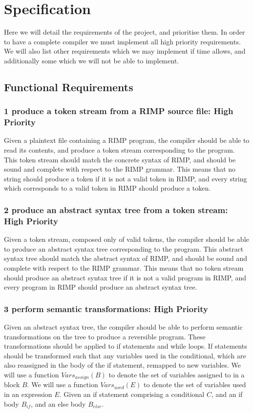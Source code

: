 \section*{Specification}

Here we will detail the requirements of the project, and prioritise them.
In order to have a complete compiler we must implement all high priority requirements.
We will also list other requirements which we may implement if time allows, and additionally some which we will not be able to implement.

\subsection*{Functional Requirements}
\subsubsection[1]{1 produce a token stream from a RIMP source file: High Priority}
Given a plaintext file containing a RIMP program, the compiler should be able to read its contents, and produce a token stream corresponding to the program.
This token stream should match the concrete syntax of RIMP, and should be sound and complete with respect to the RIMP grammar.
This means that no string should produce a token if it is not a valid token in RIMP, and every string which corresponds to a valid token in RIMP should produce a token.

\subsubsection[2]{2 produce an abstract syntax tree from a token stream: High Priority}
Given a token stream, composed only of valid tokens, the compiler should be able to produce an abstract syntax tree corresponding to the program.
This abstract syntax tree should match the abstract syntax of RIMP, and should be sound and complete with respect to the RIMP grammar.
This means that no token stream should produce an abstract syntax tree if it is not a valid program in RIMP, and every program in RIMP should produce an abstract syntax tree.

\subsubsection[3]{3 perform semantic transformations: High Priority}
Given an abstract syntax tree, the compiler should be able to perform semantic transformations on the tree to produce a reversible program.
These transformations should be applied to if statements and while loops.
If statements should be transformed such that any variables used in the conditional, which are also reassigned in the body of the if statement, remapped to new variables.
We will use a function $Vars_{assign}(B)$ to denote the set of variables assigned to in a block $B$.
We will use a function $Vars_{used}(E)$ to denote the set of variables used in an expression $E$.
Given an if statement comprising a conditional $C$, and an if body $B_{if}$, and an else body $B_{else}$.


